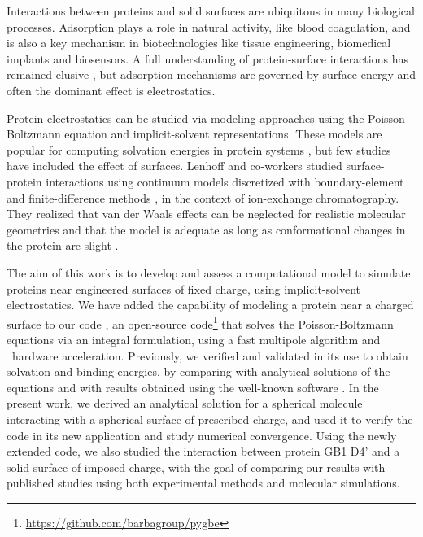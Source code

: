 
Interactions between proteins and solid surfaces are ubiquitous in many biological processes. Adsorption plays a role in natural activity, like blood coagulation, and is also a key mechanism in biotechnologies like tissue engineering, biomedical implants and biosensors.
A full understanding of protein-surface interactions has remained elusive \cite{Gray2004,RabeVerdesSeegel2011}, but adsorption mechanisms are governed by surface energy and often the dominant effect is electrostatics.

Protein electrostatics can be studied via modeling approaches using the Poisson-Boltzmann equation and implicit-solvent representations. These models  are popular for computing solvation energies in protein systems \cite{RouxSimonson1999,Bardhan2012}, but few studies have included the effect of surfaces. Lenhoff and co-workers studied surface-protein interactions using continuum models discretized with boundary-element \cite{YoonLenhoff1992,RothLenhoff1993,AsthagiriLenhoff1997} and finite-difference methods \cite{YaoLenhoff2004,YaoLenhoff2005}, in the context of ion-exchange chromatography. They realized that van der Waals effects can be neglected for realistic molecular geometries \cite{RothNealLenhoff1996} and that the model is adequate as long as conformational changes in the protein are slight \cite{YaoLenhoff2004,YaoLenhoff2005}. 

The aim of this work is to develop and assess a computational model to simulate proteins near engineered surfaces of fixed charge, using implicit-solvent electrostatics.
We have added the capability of modeling a protein near a charged surface to our code \pygbe, an open-source code\footnote{\url{https://github.com/barbagroup/pygbe}}  that solves the Poisson-Boltzmann equations via an integral formulation, using a fast multipole algorithm and \gpu\ hardware acceleration.  Previously, we verified and validated \pygbe in its use to obtain solvation and binding energies, by comparing with analytical solutions of the equations and with results obtained using the well-known \apbs software \cite{CooperBarba-share154331,CooperBardhanBarba2013}. 
In the present work, we derived an analytical solution for a spherical molecule interacting with a spherical surface of prescribed charge, and used it to verify the code in its new application and study numerical convergence.
Using the newly extended code, we also studied the interaction between protein GB1 D4' and a solid surface of imposed charge, with the goal of comparing our results with published studies using both experimental methods and molecular simulations.

